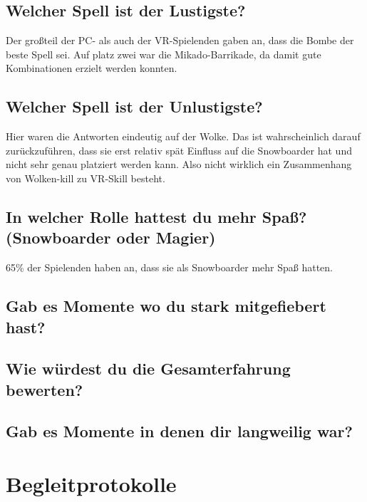 \subsection{Welcher Spell ist der Lustigste?}
Der großteil der PC- als auch der VR-Spielenden gaben an, dass die Bombe der beste Spell sei. Auf platz zwei war die Mikado-Barrikade, da damit gute Kombinationen erzielt werden konnten.

\subsection{Welcher Spell ist der Unlustigste?}
Hier waren die Antworten eindeutig auf der Wolke. Das ist wahrscheinlich darauf zurückzuführen, dass sie erst relativ spät Einfluss auf die Snowboarder hat und nicht sehr genau platziert werden kann. Also nicht wirklich ein Zusammenhang von Wolken-kill zu VR-Skill besteht.

\subsection{In welcher Rolle hattest du mehr Spaß? (Snowboarder oder Magier)}
65\% der Spielenden haben an, dass sie als Snowboarder mehr Spaß hatten.

\subsection{Gab es Momente wo du stark mitgefiebert hast?}

\subsection{Wie würdest du die Gesamterfahrung bewerten?}

\subsection{Gab es Momente in denen dir langweilig war?}

%

\section{Begleitprotokolle}
%
